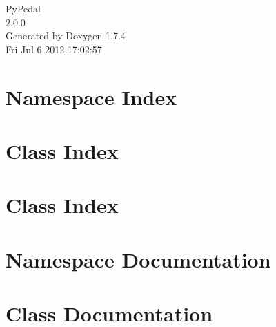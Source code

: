\documentclass[letterpaper]{book}
\begin{document}
\hypersetup{pageanchor=false}
\begin{titlepage}
\vspace*{7cm}
\begin{center}
{\Large PyPedal \\[1ex]\large 2.0.0 }\\
\vspace*{1cm}
{\large Generated by Doxygen 1.7.4}\\
\vspace*{0.5cm}
{\small Fri Jul 6 2012 17:02:57}\\
\end{center}
\end{titlepage}
\clearemptydoublepage
{}
\tableofcontents
\clearemptydoublepage
{}
\hypersetup{pageanchor=true}
\chapter{Namespace Index}

\chapter{Class Index}

\chapter{Class Index}

\chapter{Namespace Documentation}












\chapter{Class Documentation}

















\printindex
\end{document}
